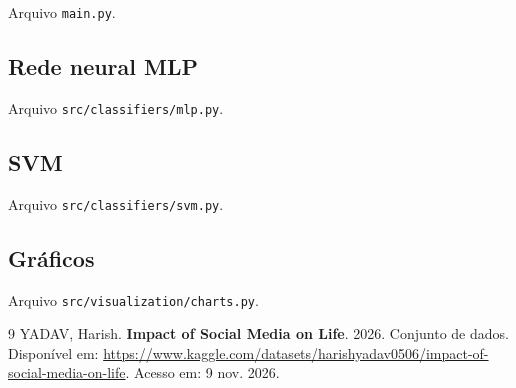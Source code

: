 \documentclass[
  article,
  12pt,
  oneside,
  a4paper,
  english,
  brazil,
  chapter=TITLE,
  section=TITLE,
  subsection=TITLE
]{abntex2}
\begin{document}
Arquivo \texttt{main.py}.



\subsection{Rede neural MLP}

Arquivo \texttt{src/classifiers/}\allowbreak\texttt{mlp.py}.



\subsection{SVM}

Arquivo \texttt{src/classifiers/}\allowbreak\texttt{svm.py}.



\subsection{Gráficos}

Arquivo \texttt{src/visualization/}\allowbreak\texttt{charts.py}.



\postextual

\begin{thebibliography}{9}
YADAV, Harish. \textbf{Impact of Social Media on Life}. 2026. Conjunto de dados. Disponível em: \url{https://www.kaggle.com/datasets/harishyadav0506/impact-of-social-media-on-life}. Acesso em: 9 nov. 2026.
\end{thebibliography}
\end{document}
